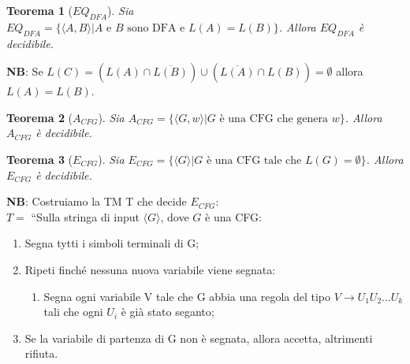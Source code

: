 \documentclass[11pt]{article}
\newtheorem{theorem}{Teorema}[section]
\begin{document}
\begin{theorem}[$EQ_{DFA}$]
	Sia $EQ_{DFA} = \{\langle A, B \rangle | A \text{ e } B \text{ sono DFA e }
	L(A) = L(B)\}$. Allora $EQ_{DFA}$ è decidibile.
\end{theorem}

\textbf{NB}: Se $L(C) = (L(A) \cap \overline{L(B)}) \cup (\overline{L(A)} \cap
L(B)) = \emptyset$ allora $L(A) = L(B)$.

\begin{theorem}[$A_{CFG}$]
	Sia $A_{CFG} = \{\langle G, w \rangle | G \text{ è una CFG che genera } 
	w\}$. Allora $A_{CFG}$ è decidibile.
\end{theorem}

\begin{theorem}[$E_{CFG}$]
	Sia $E_{CFG} = \{\langle G \rangle | G \text{ è una CFG tale che } L(G) = 
	\emptyset\}$. Allora $E_{CFG}$ è decidibile.
\end{theorem}

\textbf{NB}: Costruiamo la TM T che decide $E_{CFG}$:\\

$T = $ ``Sulla stringa di input $\langle G \rangle$, dove $G$ è una CFG:
\begin{enumerate}
	\item Segna tytti i simboli terminali di G;
	\item Ripeti finché nessuna nuova variabile viene segnata:
	\begin{enumerate}
		\item Segna ogni variabile V tale che G abbia una regola del tipo $V 
			\rightarrow U_1 U_2 \dots U_k$ tali che ogni $U_i$ è già stato
			seganto;
	\end{enumerate}
	\item Se la variabile di partenza di G non è segnata, allora accetta, 
		altrimenti rifiuta.
\end{enumerate}
\end{document}
